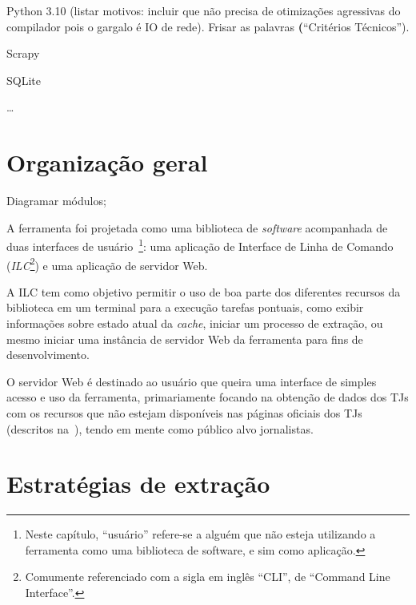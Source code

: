 \begin{todolist}
    \item Python 3.10 (listar motivos: incluir que não precisa de otimizações
        agressivas do compilador pois o gargalo é IO de rede). Frisar as
        palavras \textbf(``Critérios Técnicos'').
    \item Scrapy
    \item SQLite
    \item \ldots
\end{todolist}

\section{Organização geral}

\begin{todolist}
    \item Diagramar módulos;
\end{todolist}

A ferramenta foi projetada como uma biblioteca de \textit{software} acompanhada
de duas interfaces de usuário~\footnote{Neste capítulo, ``usuário'' refere-se a
alguém que não esteja utilizando a ferramenta como uma biblioteca de software,
e sim como aplicação.}: uma aplicação de Interface de Linha de Comando
(\textit{ILC}\footnote{Comumente referenciado com a sigla em inglês ``CLI'', de
``Command Line Interface''.}) e uma aplicação de servidor Web.

A ILC tem como objetivo permitir o uso de boa parte dos diferentes recursos da
biblioteca em um terminal para a execução tarefas pontuais, como exibir
informações sobre estado atual da \textit{cache}, iniciar um processo de
extração, ou mesmo iniciar uma instância de servidor Web da ferramenta para
fins de desenvolvimento.

O servidor Web é destinado ao usuário que queira uma interface de simples
acesso e uso da ferramenta, primariamente focando na obtenção de dados dos TJs
com os recursos que não estejam disponíveis nas páginas oficiais dos TJs
(descritos na~), tendo em mente como público
alvo jornalistas.

\section{Estratégias de extração}

